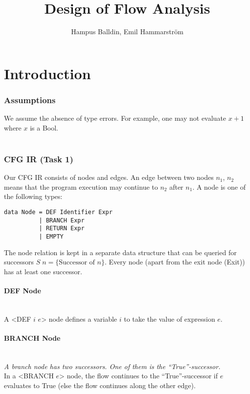\documentclass[a4paper]{article}
\title{Design of Flow Analysis}
\author{Hampus Balldin, Emil Hammarström
}
\newcommand{\NL}[0]{ \hfill\\\noindent }
\begin{document}
\thispagestyle{empty}


\maketitle                    %
{}
\newpage
\tableofcontents
{}
\newpage
\section{Introduction}
\subsubsection{Assumptions}
We assume the absence of type errors. For example, one may not evaluate $x + 1$ where $x$ is a Bool.\NL\NL

\subsubsection{CFG IR (Task 1)}
Our CFG IR consists of nodes and edges. An edge between two nodes $n_1$, $n_2$ means that the program execution may continue to $n_2$ after $n_1$. A node is one of the following types:

\begin{verbatim}
data Node = DEF Identifier Expr
		  | BRANCH Expr
	      | RETURN Expr
          | EMPTY
\end{verbatim}
\noindent
The node relation is kept in a separate data structure that can be queried for successors $S\;n = \{ \text{Successor of } n \}$. Every node (apart from the exit node (Exit)) has at least one successor. 

\paragraph{DEF Node}\NL
A <DEF $i$ $e$> node defines a variable $i$ to take the value of expression $e$. 

\paragraph{BRANCH Node}\NL
\textit{A branch node has two successors. One of them is the ``True''-successor.} \NL
In a <BRANCH $e$> node, the flow continues to the ``True''-successor if $e$ evaluates to True (else the flow continues along the other edge).
\end{document}
